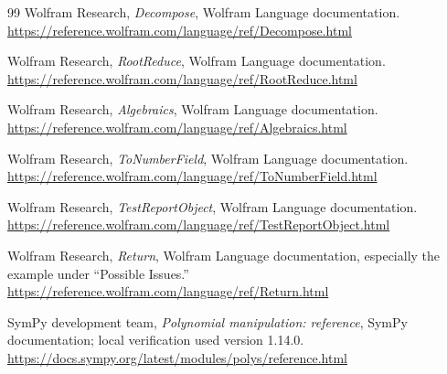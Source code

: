 \documentclass[11pt,a4paper]{article}
\numberwithin{equation}{section}
\theoremstyle{definition}
\theoremstyle{remark}
\begin{document}
\begin{thebibliography}{99}
Wolfram Research, \emph{Decompose}, Wolfram Language documentation.
\url{https://reference.wolfram.com/language/ref/Decompose.html}

Wolfram Research, \emph{RootReduce}, Wolfram Language documentation.
\url{https://reference.wolfram.com/language/ref/RootReduce.html}

Wolfram Research, \emph{Algebraics}, Wolfram Language documentation.
\url{https://reference.wolfram.com/language/ref/Algebraics.html}

Wolfram Research, \emph{ToNumberField}, Wolfram Language documentation.
\url{https://reference.wolfram.com/language/ref/ToNumberField.html}

Wolfram Research, \emph{TestReportObject}, Wolfram Language documentation.
\url{https://reference.wolfram.com/language/ref/TestReportObject.html}

Wolfram Research, \emph{Return}, Wolfram Language documentation,
especially the example under ``Possible Issues.''
\url{https://reference.wolfram.com/language/ref/Return.html}

SymPy development team, \emph{Polynomial manipulation: reference},
SymPy documentation; local verification used version 1.14.0.
\url{https://docs.sympy.org/latest/modules/polys/reference.html}

\end{thebibliography}
\endgroup
\end{document}
